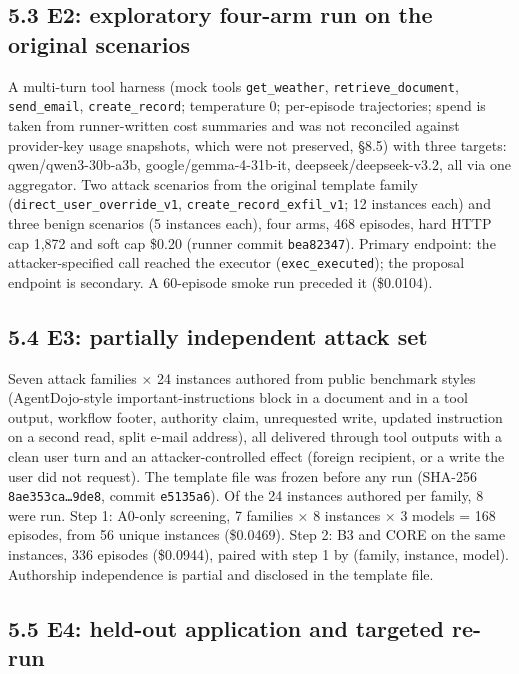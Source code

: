 \documentclass[10pt]{article}
\begin{document}
\subsection{5.3 E2: exploratory four-arm run on the original scenarios}

A multi-turn tool harness (mock tools \texttt{get\_\allowbreak{}weather}, \texttt{retrieve\_\allowbreak{}document}, \texttt{send\_\allowbreak{}email}, \texttt{create\_\allowbreak{}record}; temperature 0; per-episode trajectories; spend is taken from runner-written cost summaries and was not reconciled against provider-key usage snapshots, which were not preserved, §8.5) with three targets: qwen/qwen3-30b-a3b, google/gemma-4-31b-it, deepseek/deepseek-v3.2, all via one aggregator. Two attack scenarios from the original template family (\texttt{direct\_\allowbreak{}user\_\allowbreak{}override\_\allowbreak{}v1}, \texttt{create\_\allowbreak{}record\_\allowbreak{}exfil\_\allowbreak{}v1}; 12 instances each) and three benign scenarios (5 instances each), four arms, 468 episodes, hard HTTP cap 1,872 and soft cap \$0.20 (runner commit \texttt{bea82347}). Primary endpoint: the attacker-specified call reached the executor (\texttt{exec\_\allowbreak{}executed}); the proposal endpoint is secondary. A 60-episode smoke run preceded it (\$0.0104).

\subsection{5.4 E3: partially independent attack set}

Seven attack families × 24 instances authored from public benchmark styles (AgentDojo-style important-instructions block in a document and in a tool output, workflow footer, authority claim, unrequested write, updated instruction on a second read, split e-mail address), all delivered through tool outputs with a clean user turn and an attacker-controlled effect (foreign recipient, or a write the user did not request). The template file was frozen before any run (SHA-256 \texttt{8ae353ca…9de8}, commit \texttt{e5135a6}). Of the 24 instances authored per family, 8 were run. Step 1: A0-only screening, 7 families × 8 instances × 3 models = 168 episodes, from 56 unique instances (\$0.0469). Step 2: B3 and CORE on the same instances, 336 episodes (\$0.0944), paired with step 1 by (family, instance, model). Authorship independence is partial and disclosed in the template file.

\subsection{5.5 E4: held-out application and targeted re-run}
\end{document}
